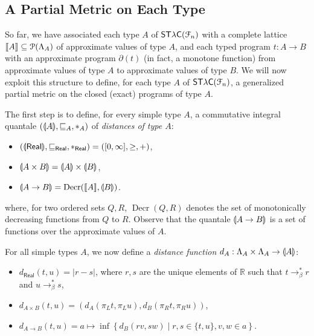 \subsection{A Partial Metric on Each Type}
\label{subsection:type-gpms}

So far, we have associated each type $A$ of $\mathsf{ST\lambda C}(\mathcal F_{n})$ with a complete lattice $\llbracket A \rrbracket\subseteq \mathcal P(\Lambda_{A})$ of approximate values of type $A$, and each typed program $t:A\to B$ with an approximate program $\partial(t)$ (in fact, a monotone function) from approximate values of type $A$ to approximate values of type $B$.
We will now exploit this structure to define, for each type $A$ of $\mathsf{ST\lambda C}(\mathcal F_{n})$, a generalized partial metric on the closed (exact) programs of type $A$. %



The first step is to define, for every simple type $A$, a commutative integral quantale $(\llparenthesis A \rrparenthesis, \sqsubseteq_A, \mathbin{\ast}_A)$ of \emph{distances of type $A$}:
\begin{itemize}
\item $(\llparenthesis \mathsf{Real} \rrparenthesis, \sqsubseteq_\mathsf{Real}, \mathbin{\ast}_\mathsf{Real}) = ([0,\infty], \geq, +)$,
\item $\llparenthesis A \times B \rrparenthesis = \llparenthesis A \rrparenthesis \times \llparenthesis B \rrparenthesis$,
\item $\llparenthesis A \to B \rrparenthesis =\operatorname{Decr}(\llbracket A \rrbracket, \llparenthesis B \rrparenthesis)$.
\end{itemize}
where, for two ordered sets $Q,R$, $\operatorname{Decr}(Q,R)$ denotes the set of monotonically decreasing functions from $Q$ to $R$.
Observe that the quantale $\llparenthesis A\to B \rrparenthesis$ is a set of functions over the approximate values of $A$.

For all simple types $A$, we now define a \emph{distance function} $d_A : \Lambda_A \times \Lambda_A \to \llparenthesis A \rrparenthesis$:
\begin{itemize}
\item $d_\mathsf{Real}(t,u) = \left\vert r-s \right\vert$, where $r,s$ are the unique elements of $\mathbb{R}$ such that $t \to_\beta^* r$ and $u \to_\beta^* s$,
\item $d_{A \times B}(t,u) = (d_A(\pi_L t, \pi_L u), d_B(\pi_R t, \pi_R u))$,
\item $d_{A \to B}(t,u) = a \mapsto \inf \left\{ d_B(rv, sw) \mid r,s \in \{t,u\}, v,w \in a \right\}$.
\end{itemize}


